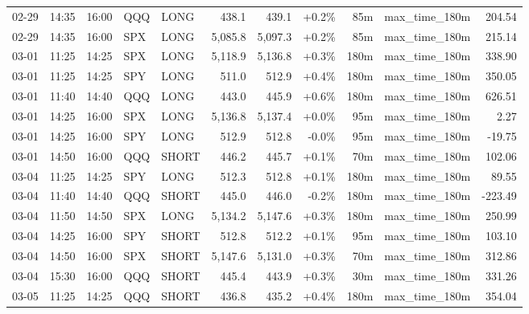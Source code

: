 \documentclass[11pt,a4paper,twoside]{article}
\begin{document}
\begin{center}
\begin{longtable}{>{\color{txtmain}}l l l l l r r r r >{\color{txtmain}}l r}
02-29 & 14:35 & 16:00 & QQQ & LONG & 438.1 & 439.1 & \textcolor{wingreen}{+0.2\%} & 85m & max\_time\_180m & \textcolor{wingreen}{204.54} \\
02-29 & 14:35 & 16:00 & SPX & LONG & 5,085.8 & 5,097.3 & \textcolor{wingreen}{+0.2\%} & 85m & max\_time\_180m & \textcolor{wingreen}{215.14} \\
03-01 & 11:25 & 14:25 & SPX & LONG & 5,118.9 & 5,136.8 & \textcolor{wingreen}{+0.3\%} & 180m & max\_time\_180m & \textcolor{wingreen}{338.90} \\
03-01 & 11:25 & 14:25 & SPY & LONG & 511.0 & 512.9 & \textcolor{wingreen}{+0.4\%} & 180m & max\_time\_180m & \textcolor{wingreen}{350.05} \\
03-01 & 11:40 & 14:40 & QQQ & LONG & 443.0 & 445.9 & \textcolor{wingreen}{+0.6\%} & 180m & max\_time\_180m & \textcolor{wingreen}{626.51} \\
03-01 & 14:25 & 16:00 & SPX & LONG & 5,136.8 & 5,137.4 & \textcolor{wingreen}{+0.0\%} & 95m & max\_time\_180m & \textcolor{wingreen}{2.27} \\
03-01 & 14:25 & 16:00 & SPY & LONG & 512.9 & 512.8 & \textcolor{lossred}{-0.0\%} & 95m & max\_time\_180m & \textcolor{lossred}{-19.75} \\
03-01 & 14:50 & 16:00 & QQQ & SHORT & 446.2 & 445.7 & \textcolor{wingreen}{+0.1\%} & 70m & max\_time\_180m & \textcolor{wingreen}{102.06} \\
03-04 & 11:25 & 14:25 & SPY & LONG & 512.3 & 512.8 & \textcolor{wingreen}{+0.1\%} & 180m & max\_time\_180m & \textcolor{wingreen}{89.55} \\
03-04 & 11:40 & 14:40 & QQQ & SHORT & 445.0 & 446.0 & \textcolor{lossred}{-0.2\%} & 180m & max\_time\_180m & \textcolor{lossred}{-223.49} \\
03-04 & 11:50 & 14:50 & SPX & LONG & 5,134.2 & 5,147.6 & \textcolor{wingreen}{+0.3\%} & 180m & max\_time\_180m & \textcolor{wingreen}{250.99} \\
03-04 & 14:25 & 16:00 & SPY & SHORT & 512.8 & 512.2 & \textcolor{wingreen}{+0.1\%} & 95m & max\_time\_180m & \textcolor{wingreen}{103.10} \\
03-04 & 14:50 & 16:00 & SPX & SHORT & 5,147.6 & 5,131.0 & \textcolor{wingreen}{+0.3\%} & 70m & max\_time\_180m & \textcolor{wingreen}{312.86} \\
03-04 & 15:30 & 16:00 & QQQ & SHORT & 445.4 & 443.9 & \textcolor{wingreen}{+0.3\%} & 30m & max\_time\_180m & \textcolor{wingreen}{331.26} \\
03-05 & 11:25 & 14:25 & QQQ & SHORT & 436.8 & 435.2 & \textcolor{wingreen}{+0.4\%} & 180m & max\_time\_180m & \textcolor{wingreen}{354.04} \\

\end{longtable}
\end{center}
\end{document}
